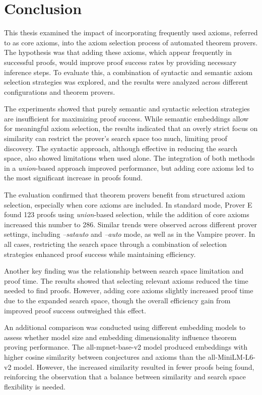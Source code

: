 \documentclass[english,version-2020-11]{uzl-thesis}
\begin{document}
\chapter{Conclusion}
\label{chapter-conclusion}
This thesis examined the impact of incorporating frequently used axioms, referred to as core axioms, into the axiom selection process of automated theorem provers. The hypothesis was that adding these axioms, which appear frequently in successful proofs, would improve proof success rates by providing necessary inference steps. To evaluate this, a combination of syntactic and semantic axiom selection strategies was explored, and the results were analyzed across different configurations and theorem provers.

The experiments showed that purely semantic and syntactic selection strategies are insufficient for maximizing proof success. While semantic embeddings allow for meaningful axiom selection, the results indicated that an overly strict focus on similarity can restrict the prover’s search space too much, limiting proof discovery. The syntactic approach, although effective in reducing the search space, also showed limitations when used alone. The integration of both methods in a \textit{union}-based approach improved performance, but adding core axioms led to the most significant increase in proofs found.

The evaluation confirmed that theorem provers benefit from structured axiom selection, especially when core axioms are included. In standard mode, Prover E found 123 proofs using \textit{union}-based selection, while the addition of core axioms increased this number to 286. Similar trends were observed across different prover settings, including \textit{--satauto} and \textit{--auto} mode, as well as in the Vampire prover. In all cases, restricting the search space through a combination of selection strategies enhanced proof success while maintaining efficiency.

Another key finding was the relationship between search space limitation and proof time. The results showed that selecting relevant axioms reduced the time needed to find proofs. However, adding core axioms slightly increased proof time due to the expanded search space, though the overall efficiency gain from improved proof success outweighed this effect.

An additional comparison was conducted using different embedding models to assess whether model size and embedding dimensionality influence theorem proving performance. The all-mpnet-base-v2 model produced embeddings with higher cosine similarity between conjectures and axioms than the all-MiniLM-L6-v2 model. However, the increased similarity resulted in fewer proofs being found, reinforcing the observation that a balance between similarity and search space flexibility is needed. 
\end{document}
